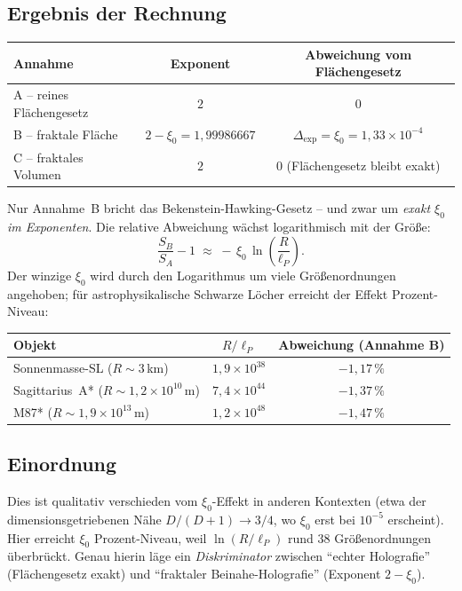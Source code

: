 \subsection*{Ergebnis der Rechnung}

\begin{center}
\begin{tabular}{lcc}
\toprule
Annahme & Exponent & Abweichung vom Flächengesetz \\
\midrule
A -- reines Flächengesetz & $2$ & $0$ \\
B -- fraktale Fläche      & $2 - \xi_0 = 1{,}99986667$ & $\Delta_{\text{exp}} = \xi_0 = 1{,}33\times10^{-4}$ \\
C -- fraktales Volumen    & $2$ & $0$ (Flächengesetz bleibt exakt) \\
\bottomrule
\end{tabular}
\end{center}

\medskip

\noindent
Nur Annahme~B bricht das Bekenstein-Hawking-Gesetz -- und zwar um
\emph{exakt $\xi_0$ im Exponenten}. Die relative Abweichung wächst
logarithmisch mit der Größe:
\[
\frac{S_B}{S_A} - 1 \;\approx\; -\,\xi_0 \,\ln\!\left(\frac{R}{\ell_P}\right).
\]
Der winzige $\xi_0$ wird durch den Logarithmus um viele Größenordnungen
angehoben; für astrophysikalische Schwarze Löcher erreicht der Effekt
Prozent-Niveau:

\begin{center}
\begin{tabular}{lcc}
\toprule
Objekt & $R/\ell_P$ & Abweichung (Annahme B) \\
\midrule
Sonnenmasse-SL ($R\sim 3$\,km)        & $1{,}9\times10^{38}$ & $-1{,}17\,\%$ \\
Sagittarius~A* ($R\sim 1{,}2\times10^{10}$\,m) & $7{,}4\times10^{44}$ & $-1{,}37\,\%$ \\
M87* ($R\sim 1{,}9\times10^{13}$\,m)  & $1{,}2\times10^{48}$ & $-1{,}47\,\%$ \\
\bottomrule
\end{tabular}
\end{center}

\subsection*{Einordnung}

Dies ist qualitativ verschieden vom $\xi_0$-Effekt in anderen Kontexten
(etwa der dimensionsgetriebenen Nähe $D/(D+1)\to 3/4$, wo $\xi_0$ erst bei
$10^{-5}$ erscheint). Hier erreicht $\xi_0$ Prozent-Niveau, weil
$\ln(R/\ell_P)$ rund $38$ Größenordnungen überbrückt. Genau hierin läge ein
\emph{Diskriminator} zwischen \enquote{echter Holografie} (Flächengesetz
exakt) und \enquote{fraktaler Beinahe-Holografie} (Exponent $2-\xi_0$).

